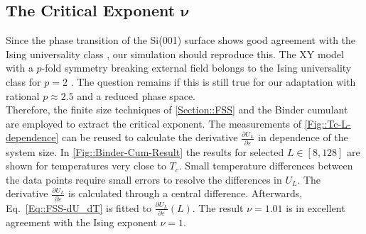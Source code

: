 	\subsection{The Critical Exponent $\boldsymbol{\nu}$} \label{Section::static-scaling}
	Since the phase transition of the Si(001) surface shows good agreement with the Ising universality class \cite{brand2023critical}, our simulation should reproduce this. The XY model with a $p$-fold symmetry breaking external field belongs to the Ising universality class for $p=2$ \cite{jose1977renormalization}. The question remains if this is still true for our adaptation with rational $p \approx 2.5$ and a reduced phase space. \\
	
	Therefore, the finite size techniques of \autoref{Section::FSS} and the Binder cumulant are employed to extract the critical exponent. The measurements of \autoref{Fig::Tc-L-dependence} can be reused to calculate the derivative $\tfrac{\partial U_L}{\partial \varepsilon}$ in dependence of the system size.
	In \autoref{Fig::Binder-Cum-Result} the results for selected $L \in \left[8, 128\right]$ are shown for temperatures very close to $T_c$. Small temperature differences between the data points require small errors to resolve the differences in $U_L$. The derivative $\tfrac{\partial U_L}{\partial \varepsilon}$ is calculated through a central difference. Afterwards, Eq.~\eqref{Eq::FSS-dU_dT} is fitted to $\tfrac{\partial U_L}{\partial \varepsilon} (L)$. The result $\nu =	1.01$ is in excellent agreement with the Ising exponent $\nu =	1$.
